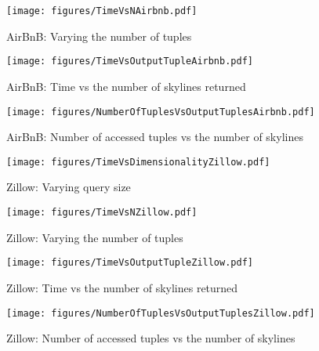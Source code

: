 \begin{figure*}[!ht]
  \vspace{-6mm}
  \begin{minipage}[t]{0.23\linewidth}
    \centering
    \texttt{[image: figures/TimeVsNAirbnb.pdf]}
    \caption{AirBnB: Varying the number of tuples}
    \label{fig:Airbnbn}    
  \end{minipage}
  \begin{minipage}[t]{0.23\linewidth}
    \centering
    \texttt{[image: figures/TimeVsOutputTupleAirbnb.pdf]}
    \caption{AirBnB: Time vs the number of skylines returned} 
    \label{fig:Airbnbp1}
  \end{minipage}
  \hspace{1mm}
  \begin{minipage}[t]{0.25\linewidth}
    \centering
    \texttt{[image: figures/NumberOfTuplesVsOutputTuplesAirbnb.pdf]}
    \caption{AirBnB: Number of accessed tuples vs the number of skylines}
    \label{fig:Airbnbp2}
  \end{minipage}
  \begin{minipage}[t]{0.25\linewidth}
    \centering
    \texttt{[image: figures/TimeVsDimensionalityZillow.pdf]}
    \caption{Zillow: Varying query size}
    \label{fig:Zillowm}
  \end{minipage}
\end{figure*}

\begin{figure*}[!ht]
  \begin{minipage}[t]{0.3\linewidth}
    \centering
    \texttt{[image: figures/TimeVsNZillow.pdf]}
    \caption{Zillow: Varying the number of tuples}
    \label{fig:TimeVsNZillow}
  \end{minipage}
  \hspace{2mm}
  \begin{minipage}[t]{0.3\linewidth}
    \centering
    \texttt{[image: figures/TimeVsOutputTupleZillow.pdf]}
    \caption{Zillow: Time vs the number of skylines returned}
    \label{fig:NumberOfTuplesVsSkylines}
  \end{minipage}
  \begin{minipage}[t]{0.3\linewidth}
    \centering
    \texttt{[image: figures/NumberOfTuplesVsOutputTuplesZillow.pdf]}
    \caption{Zillow: Number of accessed tuples vs the number of skylines}
    \label{fig:NumberOfTuplesVsOutputTuplesZillow}
  \end{minipage}
\end{figure*}


